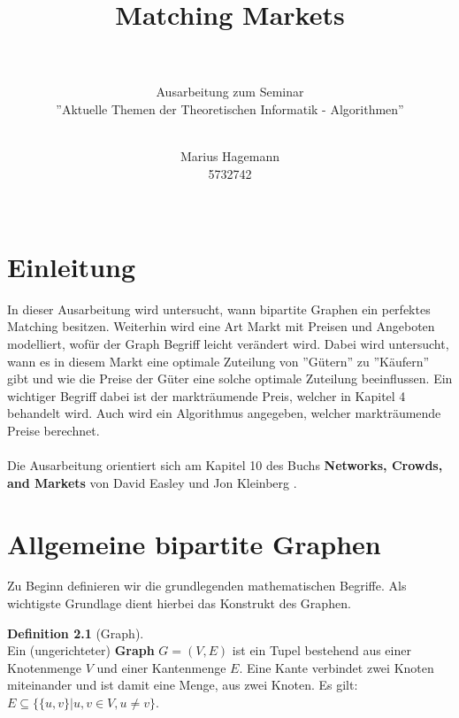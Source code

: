 \documentclass[a4paper]{scrreprt}
\title{Matching Markets \\ ~}
\subtitle{Ausarbeitung zum Seminar\\ ''Aktuelle Themen der Theoretischen Informatik - Algorithmen'' \\ ~}
\author{Marius Hagemann \\ 5732742 \\ ~}
\theoremstyle{plain} %
\theoremstyle{definition} %
\newtheorem{definition}[theorem]{Definition}
\begin{document}
\maketitle




\tableofcontents



\chapter{Einleitung}
In dieser Ausarbeitung wird untersucht, wann bipartite Graphen ein perfektes Matching 
besitzen. Weiterhin wird eine Art Markt mit Preisen und Angeboten modelliert, wofür 
der Graph Begriff leicht verändert wird. Dabei wird untersucht, wann es in diesem Markt eine
optimale Zuteilung von ''Gütern'' zu ''Käufern'' gibt und wie die Preise der Güter eine solche 
optimale Zuteilung beeinflussen.
Ein wichtiger Begriff dabei ist der markträumende Preis, welcher in Kapitel 4 behandelt wird. Auch wird
ein Algorithmus angegeben, welcher markträumende Preise berechnet.
\\
\\
Die Ausarbeitung orientiert sich am Kapitel 10 des Buchs \textbf{Networks, Crowds, and Markets} von David Easley und
Jon Kleinberg \cite{alles}.




\chapter{Allgemeine bipartite Graphen}
Zu Beginn definieren wir die grundlegenden mathematischen Begriffe. Als wichtigste Grundlage dient 
hierbei das Konstrukt des Graphen.
\begin{definition}[Graph] ~\\
Ein (ungerichteter) \textbf{Graph} $G = (V,E)$ ist ein Tupel bestehend aus einer Knotenmenge $V$ und einer Kantenmenge
 $E$. Eine Kante verbindet zwei Knoten miteinander und ist damit eine Menge, aus zwei Knoten.
 Es gilt: $E \subseteq \{ \{u,v\} | u,v \in V, u \neq v \}$.  
\end{definition}
\end{document}
